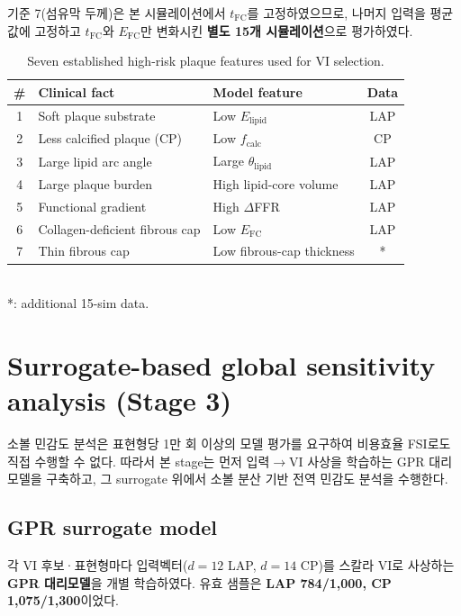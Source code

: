 \documentclass[master,english,final]{kaist-ucs}
\begin{document}
기준 7(섬유막 두께)은 본 시뮬레이션에서 $t_\mathrm{FC}$를 고정하였으므로, 나머지 입력을 평균값에 고정하고 $t_\mathrm{FC}$와 $E_\mathrm{FC}$만 변화시킨 \textbf{별도 15개 시뮬레이션}으로 평가하였다.

\begin{table}[ht]
\caption[Seven high-risk plaque features]{Seven established high-risk plaque features used for VI selection.}
\label{tab:seven-criteria}
\begin{center}
\begin{tabular}{cllc}
\hline\hline
\# & Clinical fact & Model feature & Data \\
\hline
1 & Soft plaque substrate & Low $E_\mathrm{lipid}$ & LAP \\
2 & Less calcified plaque (CP) & Low $f_\mathrm{calc}$ & CP \\
3 & Large lipid arc angle & Large $\theta_\mathrm{lipid}$ & LAP \\
4 & Large plaque burden & High lipid-core volume & LAP \\
5 & Functional gradient & High $\Delta$FFR & LAP \\
6 & Collagen-deficient fibrous cap & Low $E_\mathrm{FC}$ & LAP \\
7 & Thin fibrous cap & Low fibrous-cap thickness & * \\
\hline\hline
\end{tabular}\\
*: additional 15-sim data.
\end{center}
\end{table}

\section{Surrogate-based global sensitivity analysis (Stage 3)}

소볼 민감도 분석은 표현형당 1만 회 이상의 모델 평가를 요구하여 비용효율 FSI로도 직접 수행할 수 없다. 따라서 본 stage는 먼저 입력$\to$VI 사상을 학습하는 GPR 대리모델을 구축하고, 그 surrogate 위에서 소볼 분산 기반 전역 민감도 분석을 수행한다.

\subsection{GPR surrogate model}

각 VI 후보·표현형마다 입력벡터($d=12$ LAP, $d=14$ CP)를 스칼라 VI로 사상하는 \textbf{GPR 대리모델}을 개별 학습하였다. 유효 샘플은 \textbf{LAP 784/1{,}000, CP 1{,}075/1{,}300}이었다.
\end{document}
